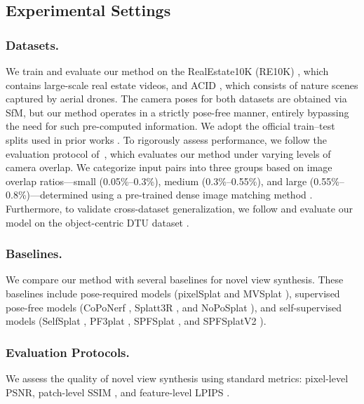 \documentclass[runningheads]{llncs}
\begin{document}
\subsection{Experimental Settings}
\vspace{-0.2cm}
\subsubsection{Datasets.}
We train and evaluate our method on the RealEstate10K (RE10K) \cite{zhou2018re10k}, which contains large-scale real estate videos, and ACID \cite{liu2021acid}, which consists of nature scenes captured by aerial drones. The camera poses for both datasets are obtained via SfM, but our method operates in a strictly pose-free manner, entirely bypassing the need for such pre-computed information.
We adopt the official train--test splits used in prior works \cite{charatan2024pixelsplat,chen2024mvsplat,ye2025noposplat,huang2025spfsplat}. To rigorously assess performance, we follow the evaluation protocol of~\cite{ye2025noposplat,huang2025spfsplat}, which evaluates our method under varying levels of camera overlap. We categorize input pairs into three groups based on image overlap ratios---small (0.05\%--0.3\%), medium (0.3\%--0.55\%), and large (0.55\%--0.8\%)---determined using a pre-trained dense image matching method \cite{edstedt2024roma}. Furthermore, to validate cross-dataset generalization, we follow \cite{chen2024mvsplat,ye2025noposplat,huang2025spfsplat} and evaluate our model on the object-centric DTU dataset \cite{jensen2014dtu}.

\vspace{-0.4cm}
\subsubsection{Baselines.}
We compare our method with several baselines for novel view synthesis. These baselines include pose-required models (pixelSplat \cite{charatan2024pixelsplat} and MVSplat \cite{chen2024mvsplat}), supervised pose-free models (CoPoNerf \cite{hong2024coponerf}, Splatt3R \cite{smart2024splatt3r}, and NoPoSplat \cite{ye2025noposplat}), and self-supervised models (SelfSplat \cite{kang2025selfsplat}, PF3plat \cite{hong2025pf3plat}, SPFSplat \cite{huang2025spfsplat}, and SPFSplatV2 \cite{huang2025spfsplatv2}).

\vspace{-0.4cm}
\subsubsection{Evaluation Protocols.}
We assess the quality of novel view synthesis using standard metrics: pixel-level PSNR, patch-level SSIM \cite{wang2004ssim}, and feature-level LPIPS \cite{zhang2018lpips}.
\end{document}
